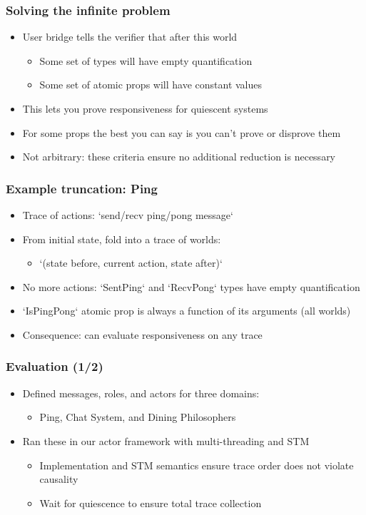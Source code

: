 \documentclass[aspectratio=169]{beamer}
\begin{document}
\begin{frame}
\frametitle{Solving the infinite problem}
\begin{itemize}
  \item User bridge tells the verifier that after this world
  \begin{itemize}
    \item Some set of types will have empty quantification
    \item Some set of atomic props will have constant values
  \end{itemize}
  \item This lets you prove responsiveness for quiescent systems
  \item For some props the best you can say is you can't prove or disprove them
  \item Not arbitrary: these criteria ensure no additional reduction is necessary
\end{itemize}
\end{frame}

\begin{frame}
\frametitle{Example truncation: Ping}
\begin{itemize}
  \item Trace of actions: `send/recv ping/pong message`
  \item From initial state, fold into a trace of worlds:
  \begin{itemize}
    \item `(state before, current action, state after)`
  \end{itemize}
  \item No more actions: `SentPing` and `RecvPong` types have empty quantification
  \item `IsPingPong` atomic prop is always a function of its arguments (all worlds)
  \item Consequence: can evaluate responsiveness on any trace
\end{itemize}
\end{frame}

\begin{frame}
\frametitle{Evaluation (1/2)}
\begin{itemize}
  \item Defined messages, roles, and actors for three domains:
  \begin{itemize}
    \item Ping, Chat System, and Dining Philosophers
  \end{itemize}
  \item Ran these in our actor framework with multi-threading and STM
  \begin{itemize}
    \item Implementation and STM semantics ensure trace order does not violate causality
    \item Wait for quiescence to ensure total trace collection
  \end{itemize}
\end{itemize}
\end{frame}
\end{document}
